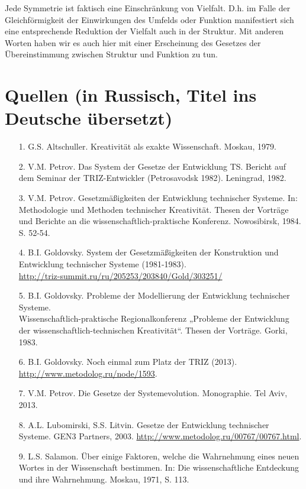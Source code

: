 \documentclass[11pt,a4paper]{article}
\begin{document}
Jede Symmetrie ist faktisch eine Einschränkung von Vielfalt. D.h. im Falle der
Gleichförmig\-keit der Einwirkungen des Umfelds oder Funktion manifestiert
sich eine entsprechende Reduktion der Vielfalt auch in der Struktur. Mit
anderen Worten haben wir es auch hier mit einer Erscheinung des Gesetzes der
Übereinstimmung zwischen Struktur und Funktion zu tun.

\section*{Quellen (in Russisch, Titel ins Deutsche übersetzt)}
\raggedright
\begin{itemize}
\item[1.] G.S. Altschuller. Kreativität als exakte Wissenschaft.  Moskau,
  1979.
\item[2.] V.M. Petrov. Das System der Gesetze der Entwicklung TS. Bericht auf
  dem Seminar der TRIZ-Entwickler (Petrosavodsk 1982). Leningrad, 1982.
\item[3.] V.M. Petrov. Gesetzmäßigkeiten der Entwicklung technischer Systeme.
  In: Methodologie und Methoden technischer Kreativität. Thesen der Vorträge
  und Berichte an die wissenschaftlich-praktische Konferenz.  Nowosibirsk,
  1984.  S. 52-54.
\item[4.] B.I. Goldovsky. System der Gesetzmäßigkeiten der Konstruktion und
  Entwicklung technischer Systeme (1981-1983).\\
  \url{http://triz-summit.ru/ru/205253/203840/Gold/303251/}
\item[5.] B.I. Goldovsky. Probleme der Modellierung der Entwicklung
  technischer Systeme.\\  Wissenschaftlich-praktische Regionalkonferenz
  „Probleme der Entwicklung der wissen\-schaftlich-technischen Kreativität“.
  Thesen der Vorträge. Gorki, 1983.
\item[6.] B.I. Goldovsky. Noch einmal zum Platz der TRIZ (2013).\\
  \url{http://www.metodolog.ru/node/1593}. 
\item[7.] V.M. Petrov. Die Gesetze der Systemevolution. Monographie. Tel Aviv,
  2013.
 \item[8.] A.L. Lubomirski, S.S. Litvin. Gesetze der Entwicklung technischer
   Systeme. GEN3 Partners, 2003.
   \url{http://www.metodolog.ru/00767/00767.html}. 
\item[9.] L.S. Salamon. Über einige Faktoren, welche die Wahrnehmung eines
  neuen Wortes in der Wissenschaft bestimmen. In: Die wissenschaftliche
  Entdeckung und ihre Wahrnehmung. Moskau, 1971, S. 113.

\end{itemize}
\end{document}

